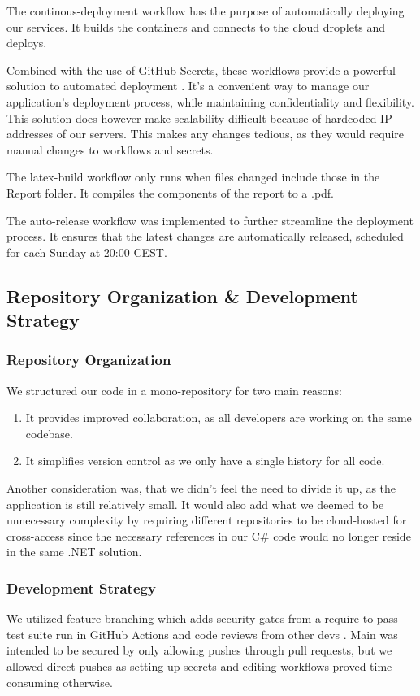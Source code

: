 The continous-deployment workflow has the purpose of automatically deploying our services. It builds the containers and connects to the cloud droplets and deploys.

Combined with the use of GitHub Secrets, these workflows provide a powerful solution to automated deployment \autocite{github-secrets}. It's a convenient way to manage our application's deployment process, while maintaining confidentiality and flexibility. This solution does however make scalability difficult because of hardcoded IP-addresses of our servers. This makes any changes tedious, as they would require manual changes to workflows and secrets.

The latex-build workflow only runs when files changed include those in the Report folder. It compiles the components of the report to a .pdf.

The auto-release workflow was implemented to further streamline the deployment process. It ensures that the latest changes are automatically released, scheduled for each Sunday at 20:00 CEST. 

\subsection{Repository Organization \& Development Strategy}
\subsubsection{Repository Organization}

We structured our code in a mono-repository for two main reasons:
\begin{enumerate}
    \item It provides improved collaboration, as all developers are working on the same codebase.
    \item It simplifies version control as we only have a single history for all code.
\end{enumerate}
Another consideration was, that we didn't feel the need to divide it up, as the application is still relatively small. It would also add what we deemed to be unnecessary complexity by requiring different repositories to be cloud-hosted for cross-access since the necessary references in our C\# code would no longer reside in the same .NET solution.


\subsubsection{Development Strategy}
We utilized feature branching which adds security gates from a require-to-pass test suite run in GitHub Actions and code reviews from other devs \autocite{github-actions}. Main was intended to be secured by only allowing pushes through pull requests, but we allowed direct pushes as setting up secrets and editing workflows proved time-consuming otherwise.

